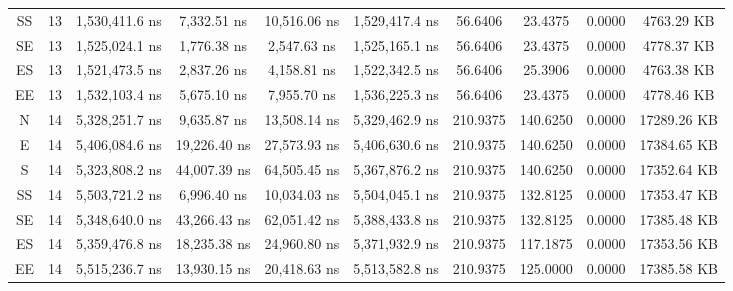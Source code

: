 \begin{sidewaystable}
\begin{tabular}{|c|c|c|c|c|c|c|c|c|c|}
        SS      &   13      &   1,530,411.6 ns        &   7,332.51 ns       &   10,516.06 ns          &   1,529,417.4 ns        &   56.6406     &   23.4375     &   0.0000      &   4763.29 KB       \\
        SE      &   13      &   1,525,024.1 ns        &   1,776.38 ns       &   2,547.63 ns           &   1,525,165.1 ns        &   56.6406     &   23.4375     &   0.0000      &   4778.37 KB       \\
        ES      &   13      &   1,521,473.5 ns        &   2,837.26 ns       &   4,158.81 ns           &   1,522,342.5 ns        &   56.6406     &   25.3906     &   0.0000      &   4763.38 KB       \\
        EE      &   13      &   1,532,103.4 ns        &   5,675.10 ns       &   7,955.70 ns           &   1,536,225.3 ns        &   56.6406     &   23.4375     &   0.0000      &   4778.46 KB       \\
        N       &   14      &   5,328,251.7 ns        &   9,635.87 ns       &   13,508.14 ns          &   5,329,462.9 ns        &   210.9375    &   140.6250    &   0.0000      &   17289.26 KB      \\
        E       &   14      &   5,406,084.6 ns        &   19,226.40 ns      &   27,573.93 ns          &   5,406,630.6 ns        &   210.9375    &   140.6250    &   0.0000      &   17384.65 KB      \\
        S       &   14      &   5,323,808.2 ns        &   44,007.39 ns      &   64,505.45 ns          &   5,367,876.2 ns        &   210.9375    &   140.6250    &   0.0000      &   17352.64 KB      \\
        SS      &   14      &   5,503,721.2 ns        &   6,996.40 ns       &   10,034.03 ns          &   5,504,045.1 ns        &   210.9375    &   132.8125    &   0.0000      &   17353.47 KB      \\
        SE      &   14      &   5,348,640.0 ns        &   43,266.43 ns      &   62,051.42 ns          &   5,388,433.8 ns        &   210.9375    &   132.8125    &   0.0000      &   17385.48 KB      \\
        ES      &   14      &   5,359,476.8 ns        &   18,235.38 ns      &   24,960.80 ns          &   5,371,932.9 ns        &   210.9375    &   117.1875    &   0.0000      &   17353.56 KB      \\
        EE      &   14      &   5,515,236.7 ns        &   13,930.15 ns      &   20,418.63 ns          &   5,513,582.8 ns        &   210.9375    &   125.0000    &   0.0000      &   17385.58 KB      \\

\end{tabular}
\end{sidewaystable}
